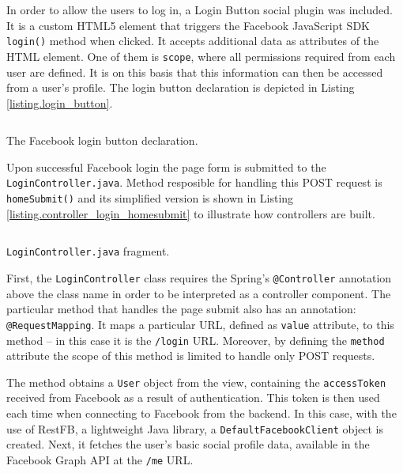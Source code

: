\documentclass[12pt]{report}
\begin{document}
In order to allow the users to log in, a Login Button social plugin was included. It is a custom HTML5 element that triggers the Facebook JavaScript SDK \texttt{login()} method when clicked. It accepts additional data as attributes of the HTML element. One of them is \texttt{scope}, where all permissions required from each user are defined. It is on this basis that this information can then be accessed from a user's profile. The login button declaration is depicted in Listing \ref{listing.login_button}.

\begin{listing}
\inputminted[framesep=3mm,fontsize=\footnotesize,bgcolor=gray!20]{html}{code_login_button.html}
\caption{The Facebook login button declaration.}
\label{listing.login_button}
\end{listing}

Upon successful Facebook login the page form is submitted to the \texttt{Login\-Controller.java}. Method resposible for handling this POST request is \texttt{home\-Submit()} and its simplified version is shown in Listing \ref{listing.controller_login_homesubmit} to illustrate how controllers are built.

\begin{listing}[!t]
\inputminted[framesep=2mm,fontsize=\footnotesize,bgcolor=gray!20]{java}{code_controller_login.java}
\caption{\texttt{LoginController.java} fragment.}
\label{listing.controller_login_homesubmit}
\end{listing}

First, the \texttt{LoginController} class requires the Spring's \texttt{@Controller} annotation above the class name in order to be interpreted as a controller component. The particular method that handles the page submit also has an annotation: \texttt{@Request\-Mapping}. It maps a particular URL, defined as \texttt{value} attribute, to this method -- in this case it is the \texttt{/login} URL. Moreover, by defining the \texttt{method} attribute the scope of this method is limited to handle only POST requests.

The method obtains a \texttt{User} object from the view, containing the \texttt{access\-Token} received from Facebook as a result of authentication. This token is then used each time when connecting to Facebook from the backend. In this case, with the use of RestFB, a lightweight Java library, a \texttt{Default\-Facebook\-Client} object is created. Next, it fetches the user's basic social profile data, available in the Facebook Graph API at the \texttt{/me} URL.
\end{document}
